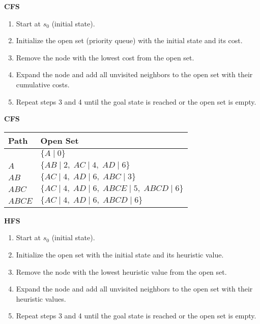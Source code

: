 \begin{process} \textbf{CFS}
    \begin{enumerate}
        \item Start at $s_0$ (initial state).
        \item Initialize the open set (priority queue) with the initial state and its cost.
        \item Remove the node with the lowest cost from the open set.
        \item Expand the node and add all unvisited neighbors to the open set with their cumulative costs.
        \item Repeat steps 3 and 4 until the goal state is reached or the open set is empty.
    \end{enumerate}
\end{process}

\begin{example} \textbf{CFS}
    \begin{center}
        \begin{tabular}{ll}
        \toprule
        \textbf{Path} & \textbf{Open Set} \\
        \midrule
         & $\{A \mid 0\}$ \\
        $A$ & $\{AB \mid 2, \; AC \mid 4, \; AD \mid 6\}$ \\
        $AB$ & $\{AC \mid 4, \; AD \mid 6, \; ABC \mid 3\}$ \\
        $ABC$ & $\{AC \mid 4, \; AD \mid 6, \; ABCE \mid 5, \; ABCD \mid 6\}$ \\
        $ABCE$ & $\{AC \mid 4, \; AD \mid 6, \; ABCD \mid 6\}$ \\
        \bottomrule
        \end{tabular}
    \end{center}
\end{example}

\begin{process} \textbf{HFS}
    \begin{enumerate}
        \item Start at $s_0$ (initial state).
        \item Initialize the open set with the initial state and its heuristic value.
        \item Remove the node with the lowest heuristic value from the open set.
        \item Expand the node and add all unvisited neighbors to the open set with their heuristic values.
        \item Repeat steps 3 and 4 until the goal state is reached or the open set is empty.
    \end{enumerate}
\end{process}


